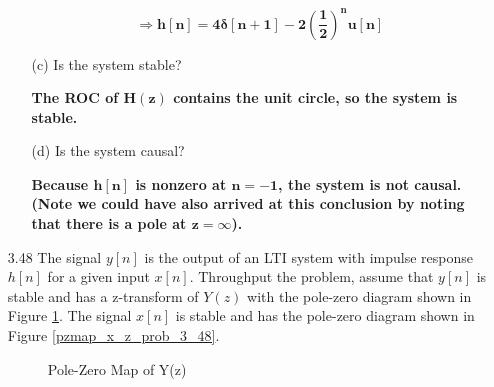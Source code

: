 \documentclass[fleqn]{article}
\begin{document}
\begin{enumerate}[nolistsep]
\begin{enumerate}[nolistsep]
						\begin{equation*}
							\mathbf{\Rightarrow h[n] = 4\delta[n+1] - 2\left(\frac{1}{2}\right)^{n}u[n]}
						\end{equation*}
					
					\item[(c)] Is the system stable?
					
						\textbf{The ROC of $\mathbf{H(z)}$ contains the unit circle, so the system is stable.}
						
					\item[(d)] Is the system causal?
					
						\textbf{Because $\mathbf{h[n]}$ is nonzero at $\mathbf{n = -1}$, the system is not causal. (Note we could have also arrived at this conclusion by noting that there is a pole at $\mathbf{z = \infty}$).}
				\end{enumerate}
				
			\item[3.48] The signal $y[n]$ is the output of an LTI system with impulse response $h[n]$ for a given input $x[n]$. Throughput the problem, assume that $y[n]$ is stable and has a z-transform of $Y(z)$ with the pole-zero diagram shown in Figure \ref{pzmap_y_z_prob_3_48}. The signal $x[n]$ is stable and has the pole-zero diagram shown in Figure \ref{pzmap_x_z_prob_3_48}. 
					
				\begin{figure}[H]				
				\centerline{}
				\caption{Pole-Zero Map of Y(z)}
				\label{pzmap_y_z_prob_3_48}
				\end{figure}
				

\end{enumerate}
\end{document}
